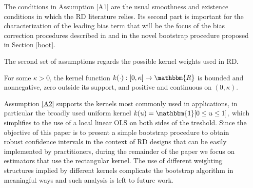 \documentclass[12pt,fleqn]{article}
\begin{document}
The conditions in Assumption \ref{A1} are the usual smoothness and existence 
conditions in which the RD literature relies. Its second part is important for 
the characterization of the leading bias term that will be the focus of the bias
correction procedures described in \cite{calonico2014} and in the novel
 bootstrap procedure proposed in Section \ref{boot}.

The second set of assumptions regards the possible kernel weights used in RD.

\begin{assumption}\label{A2}
 For some $\kappa>0$, the kernel function $k(\cdot):[0, \kappa] \rightarrow 
 \mathbbm{R}$ is bounded and nonnegative, zero outside its support, and positive
 and continuous on $(0, \kappa)$.
\end{assumption}

Assumption \ref{A2} supports the kernels most commonly used in applications, in 
particular the broadly used uniform kernel $k(u)=\mathbbm{1}[0\leq u\leq 1]$, 
which simplifies to the use of a local linear OLS on both sides of the treshold.
Since the objective of this paper is to present a simple bootstrap procedure to 
obtain robust confidence intervals in the context of RD designs that can be 
easily implemented by practitioners, during the remainder of the paper we focus 
on estimators that use the rectangular kernel. The use of different weighting 
structures implied by different kernels complicate the bootstrap algorithm in
meaningful ways and such analysis is left to future work.
\end{document}
